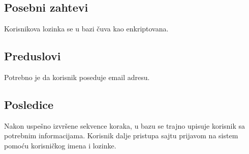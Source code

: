 \documentclass[a4paper,12pt]{report}
\begin{document}
\subsection{Posebni zahtevi}
    Korisnikova lozinka se u bazi čuva kao enkriptovana.
\subsection{Preduslovi}
    Potrebno je da korisnik poseduje email adresu. 
\subsection{Posledice}
    Nakon uspešno izvršene sekvence koraka, u bazu se trajno upisuje korisnik sa potrebnim informacijama. Korisnik dalje pristupa sajtu prijavom na sistem pomoću korisničkog imena i lozinke.
\end{document}
